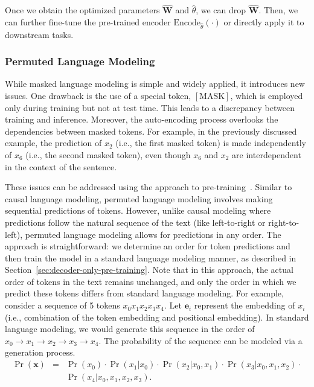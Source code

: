 Once we obtain the optimized parameters $\widehat{\mathbf{W}}$ and $\hat{\theta}$, we can drop $\widehat{\mathbf{W}}$. Then, we can further fine-tune the pre-trained encoder $\mathrm{Encode}_{\hat{\theta}}(\cdot)$ or directly apply it to downstream tasks.

\subsubsection{Permuted Language Modeling}

\noindent While masked language modeling is simple and widely applied, it introduces new issues. One drawback is the use of a special token, $[\mathrm{MASK}]$, which is employed only during training but not at test time. This leads to a discrepancy between training and inference. Moreover, the auto-encoding process overlooks the dependencies between masked tokens. For example, in the previously discussed example, the prediction of $x_2$ (i.e., the first masked token) is made independently of $x_6$ (i.e., the second masked token), even though $x_6$ and $x_2$ are interdependent in the context of the sentence.

These issues can be addressed using the  approach to pre-training~\cite{yang-etal:2019xlnet}. Similar to causal language modeling, permuted language modeling involves making sequential predictions of tokens. However, unlike causal modeling where predictions follow the natural sequence of the text (like left-to-right or right-to-left), permuted language modeling allows for predictions in any order. The approach is straightforward: we determine an order for token predictions and then train the model in a standard language modeling manner, as described in Section~\ref{sec:decoder-only-pre-training}. Note that in this approach, the actual order of tokens in the text remains unchanged, and only the order in which we predict these tokens differs from standard language modeling. For example, consider a sequence of 5 tokens $x_0 x_1 x_2 x_3 x_4$. Let $\mathbf{e}_i$ represent the embedding of $x_i$ (i.e., combination of the token embedding and positional embedding). In standard language modeling, we would generate this sequence in the order of $x_0 \to x_1 \to x_2 \to x_3 \to x_4$. The probability of the sequence can be modeled via a generation process.
\begin{eqnarray}
\Pr(\mathbf{x}) & = & \Pr(x_0) \cdot \Pr(x_1|x_0) \cdot \Pr(x_2|x_0,x_1) \cdot \Pr(x_3|x_0,x_1,x_2) \cdot \nonumber \\
                &   & \Pr(x_4|x_0,x_1,x_2,x_3).
\end{eqnarray}

